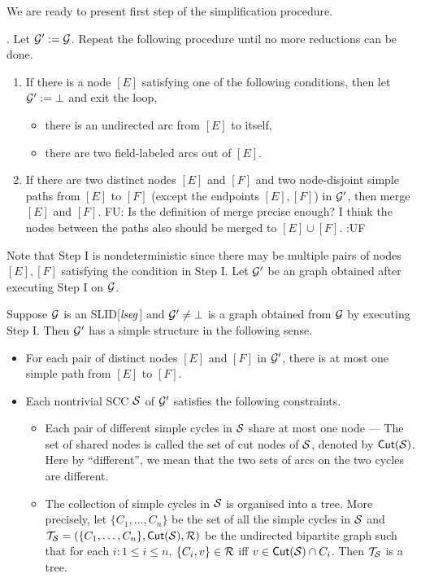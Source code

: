 \documentclass{llncs}
\newcommand{\fu}[1]{\color{purple} {FU: #1 :UF} \color{black}}
\newcommand\cutn{\mathsf{Cut}}
\begin{document}


We are ready to present first step of the simplification procedure.

\smallskip
{}. Let $\mathcal{G}':=\mathcal{G}$. Repeat the following procedure until no more reductions can be done.
\begin{enumerate}
\item If there is a node $[E]$ satisfying one of the following conditions, then let $\mathcal{G}':=\bot$ and exit the loop,
\begin{itemize}
\item there is an undirected arc from $[E]$ to itself,
%
\item there are two field-labeled arcs out of $[E]$.
\end{itemize}
%
\item If there are two distinct nodes $[E]$ and $[F]$ and two node-disjoint simple paths from $[E]$ to $[F]$ (except the endpoints $[E],[F]$) in $\mathcal{G}'$, then merge $[E]$ and $[F]$.
\fu{Is the definition of merge precise enough? I think the nodes between the paths also should be merged to $[E]\cup [F]$.}
\end{enumerate}
Note that Step I is nondeterministic since there may be multiple pairs of nodes $[E],[F]$ satisfying the condition in Step I.
Let $\mathcal{G}'$ be an graph obtained after executing Step I on $\mathcal{G}$.


\begin{proposition}\label{prop-unique-path}
Suppose $\mathcal{G}$ is an SLID[$\mathit{lseg}$] and $\mathcal{G}' \neq \bot$ is a graph obtained from $\mathcal{G}$ by executing Step I. Then $\mathcal{G}'$ has a simple structure in the following sense.
\begin{itemize}
\item For each pair of distinct nodes $[E]$ and $[F]$ in $\mathcal{G}'$, there is at most one simple path from $[E]$ to $[F]$.
%
\item Each nontrivial SCC $\mathcal{S}$ of $\mathcal{G}'$ satisfies the following constraints.
\begin{itemize}
\item Each pair of different simple cycles in $\mathcal{S}$ share at most one node --- The set of shared nodes is called the set of cut nodes of $\mathcal{S}$, denoted by $\cutn(\Ss)$. Here by ``different'', we mean that the two sets of arcs on the two cycles are different.
\item
The collection of simple cycles in $\mathcal{S}$ is organised into a tree. More precisely, let $\{C_1,\dots,C_n\}$ be the set of all the simple cycles in $\mathcal{S}$ and $\Tt_\Ss=(\{C_1,\dots,C_n\}, \cutn(\Ss), \Rr)$ be the undirected bipartite  graph such that for each $i: 1 \le i \le n$, $\{C_i, v\} \in \mathcal{R}$ iff $v \in \cutn(\Ss) \cap C_i$. Then $\mathcal{T}_{\mathcal{S}}$ is a tree.
\end{itemize}
\end{itemize}
\end{proposition}
\end{document}
